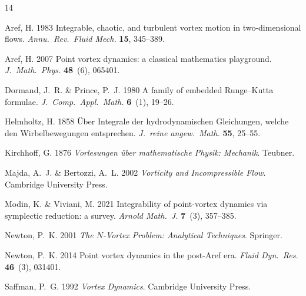 \documentclass[rapids]{jfm}
\begin{document}
\begin{thebibliography}{14}

{\sc Aref, H.} 1983
Integrable, chaotic, and turbulent vortex motion in two-dimensional flows.
{\it Annu.\ Rev.\ Fluid Mech.} {\bf 15}, 345--389.

{\sc Aref, H.} 2007
Point vortex dynamics: a classical mathematics playground.
{\it J.\ Math.\ Phys.} {\bf 48}~(6), 065401.

{\sc Dormand, J.~R. \& Prince, P.~J.} 1980
A family of embedded {R}unge--{K}utta formulae.
{\it J.\ Comp.\ Appl.\ Math.} {\bf 6}~(1), 19--26.

{\sc Helmholtz, H.} 1858
{\"U}ber {I}ntegrale der hydrodynamischen {G}leichungen, welche den {W}irbelbewegungen entsprechen.
{\it J.\ reine angew.\ Math.} {\bf 55}, 25--55.

{\sc Kirchhoff, G.} 1876
{\it Vorlesungen {\"u}ber mathematische Physik: Mechanik}.
Teubner.

{\sc Majda, A.~J. \& Bertozzi, A.~L.} 2002
{\it Vorticity and Incompressible Flow}.
Cambridge University Press.

{\sc Modin, K. \& Viviani, M.} 2021
Integrability of point-vortex dynamics via symplectic reduction: a survey.
{\it Arnold Math.\ J.} {\bf 7}~(3), 357--385.

{\sc Newton, P.~K.} 2001
{\it The $N$-Vortex Problem: Analytical Techniques}.
Springer.

{\sc Newton, P.~K.} 2014
Point vortex dynamics in the post-{A}ref era.
{\it Fluid Dyn.\ Res.} {\bf 46}~(3), 031401.

{\sc Saffman, P.~G.} 1992
{\it Vortex Dynamics}.
Cambridge University Press.

\end{thebibliography}
\end{document}
